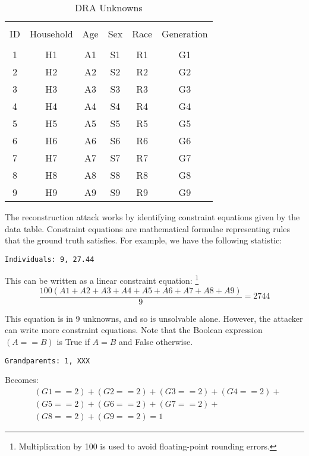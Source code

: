\documentclass[jou,apacite]{apa6}
\begin{document}
\begin{table}[t]
\caption{DRA Unknowns}\label{tab5}
\begin{tabular}{c|c|c|c|c|c}
\hline\\[-1.5ex]
ID & Household & Age & Sex & Race & Generation \\[0.5ex]
\hline\\[-1.5ex]
1 & H1 & A1 & S1 & R1 & G1  \\[0.5ex]
2 & H2 & A2 & S2 & R2 & G2  \\[0.5ex]
3 & H3 & A3 & S3 & R3 & G3  \\[0.5ex]
4 & H4 & A4 & S4 & R4 & G4  \\[0.5ex]
5 & H5 & A5 & S5 & R5 & G5  \\[0.5ex]
6 & H6 & A6 & S6 & R6 & G6  \\[0.5ex]
7 & H7 & A7 & S7 & R7 & G7  \\[0.5ex]
8 & H8 & A8 & S8 & R8 & G8  \\[0.5ex]
9 & H9 & A9 & S9 & R9 & G9  \\[0.5ex]
\hline
\end{tabular}
\end{table}

The reconstruction attack works by identifying constraint
equations given by the data table. Constraint equations are  mathematical formulae representing rules that the ground truth satisfies. For example, we have the
following statistic:
\begin{verbatim}
Individuals: 9, 27.44
\end{verbatim}

This can be written as a linear constraint equation: \footnote{Multiplication by 100 is used to avoid floating-point rounding errors.}
\[\frac{100(A1 + A2 + A3 + A4 + A5 + A6 + A7 + A8 + A9)}{9} = 2744\]

This equation is in 9 unknowns, and so is unsolvable alone.
However, the attacker can write more constraint equations.
Note that the Boolean expression $(A == B)$ is True if $A = B$ and False otherwise.

\begin{verbatim}
Grandparents: 1, XXX
\end{verbatim}


Becomes:
\begin{align*}
& (G1==2) + (G2==2) + (G3==2) + (G4==2) + \\
& (G5==2)+ (G6==2) + (G7==2) +\\
& (G8==2) + (G9==2) = 1
\end{align*}
\end{document}
